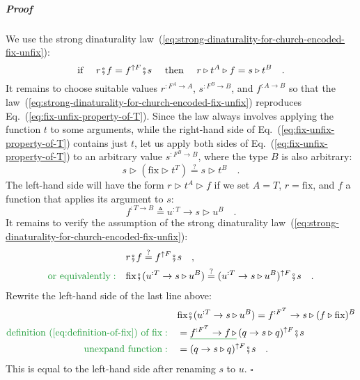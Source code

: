 \subparagraph{Proof}

We use the strong dinaturality law~(\ref{eq:strong-dinaturality-for-church-encoded-fix-unfix}):
\[
\text{if }\quad r\bef f=f^{\uparrow F}\bef s\quad\text{ then }\quad r\triangleright t^{A}\triangleright f=s\triangleright t^{B}\quad.
\]
It remains to choose suitable values $r^{:F^{A}\rightarrow A}$, $s^{:F^{B}\rightarrow B}$,
and $f^{:A\rightarrow B}$ so that the law~(\ref{eq:strong-dinaturality-for-church-encoded-fix-unfix})
reproduces Eq.~(\ref{eq:fix-unfix-property-of-T}). Since the law
always involves applying the function $t$ to some arguments, while
the right-hand side of Eq.~(\ref{eq:fix-unfix-property-of-T}) contains
just $t$, let us apply both sides of Eq.~(\ref{eq:fix-unfix-property-of-T})
to an arbitrary value $s^{:F^{B}\rightarrow B}$, where the type $B$
is also arbitrary:
\[
s\triangleright(\text{fix}\triangleright t^{T})\overset{?}{=}s\triangleright t^{B}\quad.
\]
The left-hand side will have the form $r\triangleright t^{A}\triangleright f$
if we set $A=T$, $r=\text{fix}$, and $f$ a function that applies
its argument to $s$:
\[
f^{:T\rightarrow B}\triangleq u^{:T}\rightarrow s\triangleright u^{B}\quad.
\]
It remains to verify the assumption of the strong dinaturality law~(\ref{eq:strong-dinaturality-for-church-encoded-fix-unfix}):
\begin{align*}
 & r\bef f\overset{?}{=}f^{\uparrow F}\bef s\quad,\\
{\color{greenunder}\text{or equivalently}:}\quad & \text{fix}\bef(u^{:T}\rightarrow s\triangleright u^{B})\overset{?}{=}(u^{:T}\rightarrow s\triangleright u^{B})^{\uparrow F}\bef s\quad.
\end{align*}
Rewrite the left-hand side of the last line above:
\begin{align*}
 & \text{fix}\bef(u^{:T}\rightarrow s\triangleright u^{B})=f^{:F^{T}}\rightarrow s\triangleright(f\triangleright\text{fix})^{B}\\
{\color{greenunder}\text{definition~(\ref{eq:definition-of-fix}) of }\text{fix}:}\quad & =\gunderline{f^{:F^{T}}\rightarrow f\,\triangleright}\,(q\rightarrow s\triangleright q)^{\uparrow F}\bef s\\
{\color{greenunder}\text{unexpand function}:}\quad & =(q\rightarrow s\triangleright q)^{\uparrow F}\bef s\quad.
\end{align*}
This is equal to the left-hand side after renaming $s$ to $u$. $\square$

